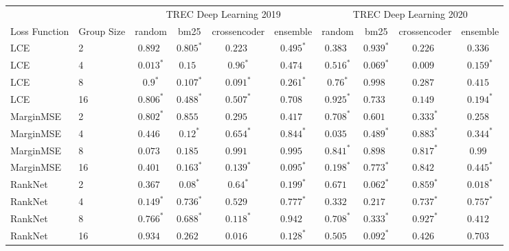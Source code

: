 \begin{table*}[tb]
\centering
\begin{tabular}{ll|cccccccc}
\toprule
&& \multicolumn{4}{c}{TREC Deep Learning 2019} & \multicolumn{4}{c}{TREC Deep Learning 2020} \\
Loss Function & Group Size & random & bm25 & crossencoder & ensemble & random & bm25 & crossencoder & ensemble \\
\midrule
LCE & 2 & $0.892\phantom{^*}$ & $0.805^*$ & $0.223\phantom{^*}$ & $0.495^*$ & $0.383\phantom{^*}$ & $0.939^*$ & $0.226\phantom{^*}$ & $0.336\phantom{^*}$ \\
LCE & 4 & $0.013^*$ & $0.15\phantom{^*}$ & $0.96^*$ & $0.474\phantom{^*}$ & $0.516^*$ & $0.069^*$ & $0.009\phantom{^*}$ & $0.159^*$ \\
LCE & 8 & $0.9^*$ & $0.107^*$ & $0.091^*$ & $0.261^*$ & $0.76^*$ & $0.998\phantom{^*}$ & $0.287\phantom{^*}$ & $0.415\phantom{^*}$ \\
LCE & 16 & $0.806^*$ & $0.488^*$ & $0.507^*$ & $0.708\phantom{^*}$ & $0.925^*$ & $0.733\phantom{^*}$ & $0.149\phantom{^*}$ & $0.194^*$ \\
\midrule
MarginMSE & 2 & $0.802^*$ & $0.855\phantom{^*}$ & $0.295\phantom{^*}$ & $0.417\phantom{^*}$ & $0.708^*$ & $0.601\phantom{^*}$ & $0.333^*$ & $0.258\phantom{^*}$ \\
MarginMSE & 4 & $0.446\phantom{^*}$ & $0.12^*$ & $0.654^*$ & $0.844^*$ & $0.035\phantom{^*}$ & $0.489^*$ & $0.883^*$ & $0.344^*$ \\
MarginMSE & 8 & $0.073\phantom{^*}$ & $0.185\phantom{^*}$ & $0.991\phantom{^*}$ & $0.995\phantom{^*}$ & $0.841^*$ & $0.898\phantom{^*}$ & $0.817^*$ & $0.99\phantom{^*}$ \\
MarginMSE & 16 & $0.401\phantom{^*}$ & $0.163^*$ & $0.139^*$ & $0.095^*$ & $0.198^*$ & $0.773^*$ & $0.842\phantom{^*}$ & $0.445^*$ \\
\midrule
RankNet & 2 & $0.367\phantom{^*}$ & $0.08^*$ & $0.64^*$ & $0.199^*$ & $0.671\phantom{^*}$ & $0.062^*$ & $0.859^*$ & $0.018^*$ \\
RankNet & 4 & $0.149^*$ & $0.736^*$ & $0.529\phantom{^*}$ & $0.777^*$ & $0.332\phantom{^*}$ & $0.217\phantom{^*}$ & $0.737^*$ & $0.757^*$ \\
RankNet & 8 & $0.766^*$ & $0.688^*$ & $0.118^*$ & $0.942\phantom{^*}$ & $0.708^*$ & $0.333^*$ & $0.927^*$ & $0.412\phantom{^*}$ \\
RankNet & 16 & $0.934\phantom{^*}$ & $0.262\phantom{^*}$ & $0.016\phantom{^*}$ & $0.128^*$ & $0.505\phantom{^*}$ & $0.092^*$ & $0.426\phantom{^*}$ & $0.703\phantom{^*}$ \\

\end{tabular}
\end{table*}
